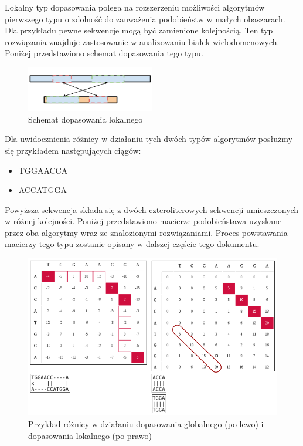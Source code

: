 \documentclass[a4paper,12pt]{article}
\newenvironment{lista}{
\begin{itemize}
  \setlength{\itemsep}{1pt}
  \setlength{\parskip}{0pt}
  \setlength{\parsep}{0pt}
}{\end{itemize}}
\begin{document}
Lokalny typ dopasowania polega na rozszerzeniu możliwości algorytmów pierwszego typu o zdolność do zauważenia podobieństw w małych obaszarach. Dla przykładu pewne sekwencje mogą być zamienione kolejnością. Ten typ rozwiązania znajduje zastosowanie w analizowaniu białek wielodomenowych.  Poniżej przedstawiono schemat dopasowania tego typu. 

\begin{figure}[H]
  \vspace{5pt}
  \centering
  \begin{center}
  \includegraphics[width=0.5\textwidth]{images/Dopasowanie_lokalne.png}
  \end{center}
  \caption{Schemat dopasowania lokalnego}
 \end{figure}
 
 
Dla uwidocznienia różnicy w działaniu tych dwóch typów algorytmów posłużmy się przykładem następujących ciągów:
\begin{lista}
 \item TGGAACCA
\item ACCATGGA
\end{lista}

Powyższa sekwencja składa się z dwóch czteroliterowych sekwencji umieszczonych w różnej kolejności. Poniżej przedstawiono macierze podobieństawa uzyskane przez oba algorytmy wraz ze znalozionymi rozwiązaniami. Proces powstawania macierzy tego typu zostanie opisany w dalszej częście tego dokumentu. 


\begin{figure}[H]
  \vspace{5pt}
  \centering
  \begin{center}
  \includegraphics[width=1.0\textwidth]{images/Globalne_lokalne_przyklad.png}
  \end{center}
  \caption{Przykład różnicy w działaniu dopasowania globalnego (po lewo) i dopasowania lokalnego (po prawo)}
 \end{figure}
\end{document}
